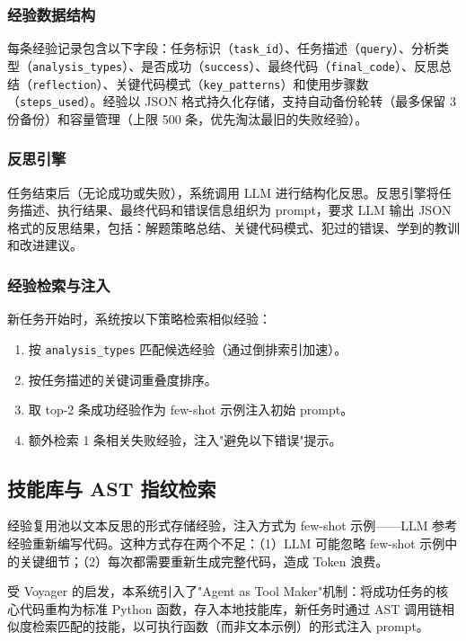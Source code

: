 \subsubsection{经验数据结构}

每条经验记录包含以下字段：任务标识（\texttt{task\_id}）、任务描述（\texttt{query}）、分析类型（\texttt{analysis\_types}）、是否成功（\texttt{success}）、最终代码（\texttt{final\_code}）、反思总结（\texttt{reflection}）、关键代码模式（\texttt{key\_patterns}）和使用步骤数（\texttt{steps\_used}）。经验以 JSON 格式持久化存储，支持自动备份轮转（最多保留 3 份备份）和容量管理（上限 500 条，优先淘汰最旧的失败经验）。

\subsubsection{反思引擎}

任务结束后（无论成功或失败），系统调用 LLM 进行结构化反思。反思引擎将任务描述、执行结果、最终代码和错误信息组织为 prompt，要求 LLM 输出 JSON 格式的反思结果，包括：解题策略总结、关键代码模式、犯过的错误、学到的教训和改进建议。

\subsubsection{经验检索与注入}

新任务开始时，系统按以下策略检索相似经验：
\begin{enumerate}
    \item 按 \texttt{analysis\_types} 匹配候选经验（通过倒排索引加速）。
    \item 按任务描述的关键词重叠度排序。
    \item 取 top-2 条成功经验作为 few-shot 示例注入初始 prompt。
    \item 额外检索 1 条相关失败经验，注入"避免以下错误"提示。
\end{enumerate}

\subsection{技能库与 AST 指纹检索}

经验复用池以文本反思的形式存储经验，注入方式为 few-shot 示例——LLM 参考经验重新编写代码。这种方式存在两个不足：（1）LLM 可能忽略 few-shot 示例中的关键细节；（2）每次都需要重新生成完整代码，造成 Token 浪费。

受 Voyager\cite{wang2023voyager} 的启发，本系统引入了"Agent as Tool Maker"机制：将成功任务的核心代码重构为标准 Python 函数，存入本地技能库，新任务时通过 AST 调用链相似度检索匹配的技能，以可执行函数（而非文本示例）的形式注入 prompt。

